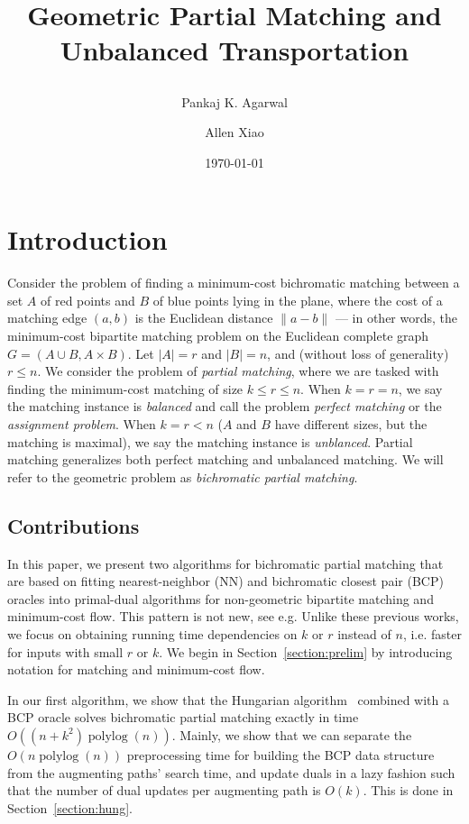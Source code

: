 \documentclass[11pt]{article}
\title{ Geometric Partial Matching and Unbalanced Transportation %
\date{\today} %
\author{
Pankaj K. Agarwal 
\and
Allen Xiao
}
}
\def\polylog{\mathop{\mathrm{polylog}}}
\theoremstyle{plain}
\begin{document}
\maketitle

\section{Introduction}

Consider the problem of finding a minimum-cost bichromatic matching between
a set $A$ of red points and $B$ of blue points lying in the plane,
where the cost of a matching edge $(a, b)$ is the Euclidean distance 
$\|a - b\|$ ---
in other words, the minimum-cost bipartite matching problem on the Euclidean 
complete graph $G = (A \cup B, A \times B)$.
Let $|A| = r$ and $|B| = n$, and (without loss of generality) $r \leq n$.
We consider the problem of \emph{partial matching}, where we are tasked with
finding the minimum-cost matching of size $k \leq r \leq n$.
When $k = r = n$, we say the matching instance is \emph{balanced}
and call the problem \emph{perfect matching} or the \emph{assignment problem}.
When $k = r < n$ ($A$ and $B$ have different sizes, but the matching is 
maximal), we say the matching instance is \emph{unblanced}.
Partial matching generalizes both perfect matching and unbalanced matching.
We will refer to the geometric problem as \emph{bichromatic partial matching}.



\subsection{Contributions}

In this paper, we present two algorithms for bichromatic partial matching
that are based on fitting nearest-neighbor (NN) and bichromatic closest pair 
(BCP) oracles into primal-dual algorithms for non-geometric bipartite matching 
and minimum-cost flow.
This pattern is not new, see e.g. %
Unlike these previous works, we focus on obtaining running time dependencies on 
$k$ or $r$ instead of $n$, i.e. faster for inputs with small $r$ or $k$.
We begin in Section~\ref{section:prelim} by introducing notation for matching 
and minimum-cost flow.


In our first algorithm, we show that the Hungarian algorithm~\cite{Kuhn55} 
combined with a BCP oracle solves bichromatic partial matching exactly in time 
$O((n + k^2)\polylog(n))$.
Mainly, we show that we can separate the $O(n\polylog(n))$ preprocessing time 
for building the BCP data structure from the augmenting paths' search time,
and update duals in a lazy fashion such that the number of dual updates per
augmenting path is $O(k)$.
This is done in Section~\ref{section:hung}.
\end{document}
